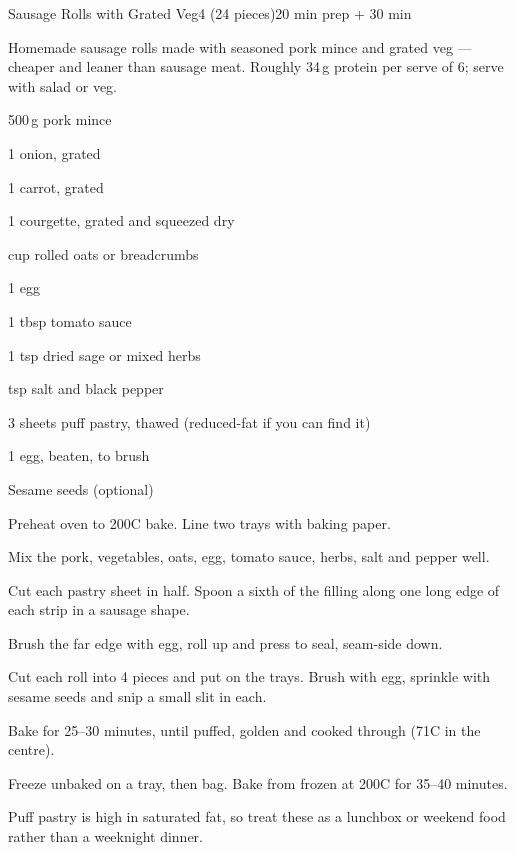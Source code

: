 \begin{recipebox}{Sausage Rolls with Grated Veg}{4 (24 pieces)}{20 min prep + 30 min}

Homemade sausage rolls made with seasoned pork mince and grated veg ---
cheaper and leaner than sausage meat. Roughly 34\,g protein per serve of 6;
serve with salad or veg.

\begin{ingredients}
  \item 500\,g pork mince
  \item 1 onion, grated
  \item 1 carrot, grated
  \item 1 courgette, grated and squeezed dry
  \item {} cup rolled oats or breadcrumbs
  \item 1 egg
  \item 1 tbsp tomato sauce
  \item 1 tsp dried sage or mixed herbs
  \item {} tsp salt and black pepper
  \item 3 sheets puff pastry, thawed (reduced-fat if you can find it)
  \item 1 egg, beaten, to brush
  \item Sesame seeds (optional)
\end{ingredients}

\begin{method}
  \item Preheat oven to 200\degree C bake. Line two trays with baking paper.
  \item Mix the pork, vegetables, oats, egg, tomato sauce, herbs, salt and pepper well.
  \item Cut each pastry sheet in half. Spoon a sixth of the filling along one long edge of each strip in a sausage shape.
  \item Brush the far edge with egg, roll up and press to seal, seam-side down.
  \item Cut each roll into 4 pieces and put on the trays. Brush with egg, sprinkle with sesame seeds and snip a small slit in each.
  \item Bake for 25--30 minutes, until puffed, golden and cooked through (71\degree C in the centre).
\end{method}

\begin{notelist}
  \item Freeze unbaked on a tray, then bag. Bake from frozen at 200\degree C for 35--40 minutes.
  \item Puff pastry is high in saturated fat, so treat these as a lunchbox or weekend food rather than a weeknight dinner.
\end{notelist}

\end{recipebox}
